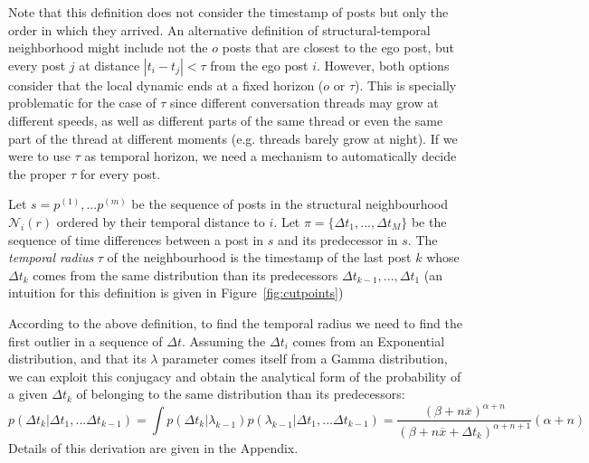 \documentclass[smallextended]{svjour3}          %
\begin{document}
Note that this definition does not consider the timestamp of posts but only the order in which they arrived. An alternative definition of structural-temporal neighborhood might include not the $o$  posts that are closest to the ego post, but every post $j$ at distance $|t_i-t_j|<\tau$ from the ego post $i$. However, both options consider that the local dynamic ends at a fixed horizon ($o$ or $\tau$). This is specially problematic for the case of $\tau$ since different conversation threads may grow at different speeds, as well as different parts of the same thread or even the same part of the thread at different moments (e.g. threads barely grow at night). If we were to use $\tau$ as temporal horizon, we need a mechanism to automatically decide the proper $\tau$ for every post. 

\begin{definition}
Let $s={p^{(1)},...p^{(m)}}$ be the sequence of posts in the structural neighbourhood $\mathcal{N}_i(r)$ ordered by their temporal distance to $i$. Let $\pi=\{\Delta t_1,...,\Delta t_M\}$ be the sequence of time differences between a post in $s$ and its predecessor in $s$. The \textit{temporal radius} $\tau$ of the neighbourhood is the timestamp of the last post $k$ whose $\Delta t_k$ comes from the same distribution than its predecessors $\Delta t_{k-1},..., \Delta t_{1}$ (an intuition for this definition is given in Figure~\ref{fig:cutpoints})
\end{definition}
 
According to the above definition, to find the temporal radius we need to find the first outlier in a sequence of $\Delta t$. Assuming the $\Delta t_i$ comes from an Exponential distribution, and that its $\lambda$ parameter comes itself from a Gamma distribution, we can exploit this conjugacy and obtain the analytical form of the probability of a given $\Delta t_k$ of belonging to the same distribution than its predecessors:
\begin{equation}
p(\Delta t_k | \Delta t_1,...\Delta t_{k-1})
=
\int p(\Delta t_k | \lambda_{k-1})p(\lambda_{k-1} |\Delta t_1,...\Delta t_{k-1})
=\frac{(\beta + n\overline{x})^{\alpha+n}}{(\beta + n\overline{x}+\Delta t_k)^{\alpha+n+1}}(\alpha+n)
\end{equation}
Details of this derivation are given in the Appendix.
\end{document}
